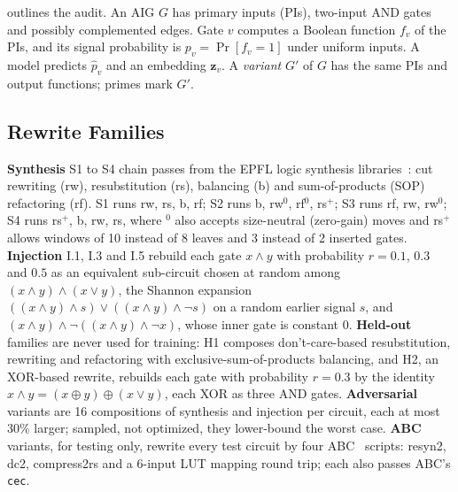  outlines the audit. An AIG $G$ has primary inputs (PIs), two-input AND gates and
possibly complemented edges.  Gate $v$ computes
a Boolean function $f_v$ of the PIs, and its signal probability is $p_v=\Pr[f_v=1]$ under uniform
inputs. A model predicts $\hat p_v$ and an embedding $\mathbf z_v$. A
\emph{variant} $G'$ of $G$ has the same PIs and output functions; primes mark $G'$.

\subsection{Rewrite Families}\label{sec:families}
\textbf{Synthesis} S1 to S4 chain passes from the EPFL logic synthesis libraries~\cite{DBLP:journals/corr/abs-1805-05121,aigverse}:
cut rewriting (rw), resubstitution (rs), balancing (b) and sum-of-products (SOP) refactoring (rf). S1 runs rw, rs, b, rf; S2 runs b,
rw$^0$, rf$^0$, rs$^+$; S3 runs rf, rw, rw$^0$; S4 runs rs$^+$, b, rw, rs, where $^0$ also accepts size-neutral
(zero-gain) moves and rs$^+$ allows windows of 10 instead of 8 leaves and 3 instead of 2 inserted gates. \textbf{Injection} I.1, I.3 and I.5 rebuild each gate
$x\wedge y$ with probability $r=0.1$, $0.3$ and $0.5$ as an equivalent sub-circuit chosen at random among
$(x\wedge y)\wedge(x\vee y)$, the Shannon expansion $((x\wedge y)\wedge s)\vee((x\wedge y)\wedge\neg s)$ on a random
earlier signal $s$, and $(x\wedge y)\wedge\neg((x\wedge y)\wedge\neg x)$, whose inner gate is constant 0.
\textbf{Held-out} families are never used for training: H1 composes don't-care-based resubstitution, rewriting
and refactoring with exclusive-sum-of-products balancing, and H2, an XOR-based rewrite, rebuilds each gate with
probability $r=0.3$ by the identity $x\wedge y=(x\oplus y)\oplus(x\vee y)$, each XOR as three AND gates. \textbf{Adversarial}
variants are 16 compositions of synthesis and injection per circuit, each at most 30\% larger; sampled, not
optimized, they lower-bound the worst case. \textbf{ABC} variants, for testing only, rewrite every test circuit by four ABC~\cite{DBLP:conf/cav/BraytonM10}
scripts: resyn2, dc2, compress2rs and a 6-input LUT mapping round trip; each also passes ABC's \texttt{cec}.

